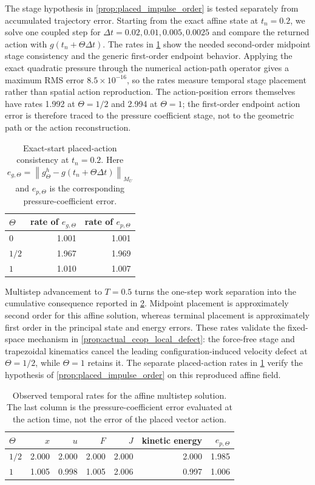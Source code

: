 \documentclass[11pt]{article}
\theoremstyle{plain}
\theoremstyle{definition}
\theoremstyle{remark}
\newcommand{\dt}{\Delta t}
\newcommand{\Th}{\Theta}
\newcommand{\norm}[2][]{\left\lVert #2\right\rVert_{#1}}
\begin{document}
The stage hypothesis in \cref{prop:placed_impulse_order} is tested separately
from accumulated trajectory error.  Starting from the exact affine state at
$t_n=0.2$, we solve one coupled step for
$\dt=0.02,0.01,0.005,0.0025$ and compare the returned action with
$g(t_n+\Th\dt)$.  The rates in \cref{tab:affine_stage_rates} show the needed
second-order midpoint stage consistency and the generic first-order endpoint
behavior.  Applying the exact quadratic pressure through the numerical
action-path operator gives a maximum RMS error
$8.5\times10^{-16}$, so the rates measure temporal stage placement rather
than spatial action reproduction.  The action-position errors themselves have
rates 1.992 at $\Th=1/2$ and 2.994 at $\Th=1$; the first-order endpoint action
error is therefore traced to the pressure coefficient stage, not to the
geometric path or the action reconstruction.

\begin{table}[t]
\centering
\caption{Exact-start placed-action consistency at $t_n=0.2$.  Here
$e_{g,\Th}=\norm[M_U]{g_\Th^h-g(t_n+\Th\dt)}$ and $e_{p,\Th}$ is the
corresponding pressure-coefficient error.}
\label{tab:affine_stage_rates}
\begin{tabular}{lrr}
\toprule
$\Th$ & rate of $e_{g,\Th}$ & rate of $e_{p,\Th}$ \\
\midrule
$0$   & 1.001 & 1.001 \\
$1/2$ & 1.967 & 1.969 \\
$1$   & 1.010 & 1.007 \\
\bottomrule
\end{tabular}
\end{table}

Multistep advancement to $T=0.5$ turns the one-step work separation into the
cumulative consequence reported in \cref{tab:affine_time_rates}.  Midpoint
placement is approximately second order for
this affine solution, whereas terminal placement is approximately first order
in the principal state and energy errors.  These rates validate
the fixed-space mechanism in
\cref{prop:actual_ccop_local_defect}: the force-free stage and trapezoidal
kinematics cancel the leading configuration-induced velocity defect at
$\Th=1/2$, while $\Th=1$ retains it.  The separate placed-action rates in
\cref{tab:affine_stage_rates} verify the hypothesis of
\cref{prop:placed_impulse_order} on this reproduced affine field.

\begin{table}[t]
\centering
\caption{Observed temporal rates for the affine multistep solution.
The last column is the pressure-coefficient error evaluated at the action
time, not the error of the placed vector action.}
\label{tab:affine_time_rates}
\begin{tabular}{lrrrrrr}
\toprule
$\Th$ & $x$ & $u$ & $F$ & $J$ & kinetic energy & $e_{p,\Th}$ \\
\midrule
$1/2$ & 2.000 & 2.000 & 2.000 & 2.000 & 2.000 & 1.985 \\
$1$   & 1.005 & 0.998 & 1.005 & 2.006 & 0.997 & 1.006 \\
\bottomrule
\end{tabular}
\end{table}
\end{document}
